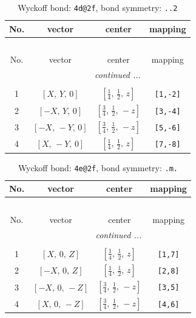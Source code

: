 \documentclass[fleqn,8pt]{jsarticle}
\begin{document}
\begin{longtable}{cccc}
\caption{Wyckoff bond: {\tt 4d@2f}, bond symmetry: {\tt ..2}}
 \\
 \hline \hline
No. & vector & center & mapping \\ \hline \endfirsthead

\multicolumn{3}{l}{\tablename\ \thetable{}} \\
 \hline \hline
No. & vector & center & mapping \\ \hline \endhead

 \hline \hline
\multicolumn{3}{r}{\footnotesize\it continued ...} \\ \endfoot

 \hline \hline
\multicolumn{3}{r}{} \\ \endlastfoot

1 & $\left[ X,\, Y,\, 0 \right]$ & $\left[ \frac{1}{4},\, \frac{1}{2},\, z \right]$ & {\tt [1,-2]} \\ \hline
2 & $\left[ - X,\, Y,\, 0 \right]$ & $\left[ \frac{3}{4},\, \frac{1}{2},\, - z \right]$ & {\tt [3,-4]} \\ \hline
3 & $\left[ - X,\, - Y,\, 0 \right]$ & $\left[ \frac{3}{4},\, \frac{1}{2},\, - z \right]$ & {\tt [5,-6]} \\ \hline
4 & $\left[ X,\, - Y,\, 0 \right]$ & $\left[ \frac{1}{4},\, \frac{1}{2},\, z \right]$ & {\tt [7,-8]} \\
\end{longtable}
\renewcommand{\arraystretch}{1.2}
\begin{longtable}{cccc}
\caption{Wyckoff bond: {\tt 4e@2f}, bond symmetry: {\tt .m.}}
 \\
 \hline \hline
No. & vector & center & mapping \\ \hline \endfirsthead

\multicolumn{3}{l}{\tablename\ \thetable{}} \\
 \hline \hline
No. & vector & center & mapping \\ \hline \endhead

 \hline \hline
\multicolumn{3}{r}{\footnotesize\it continued ...} \\ \endfoot

 \hline \hline
\multicolumn{3}{r}{} \\ \endlastfoot

1 & $\left[ X,\, 0,\, Z \right]$ & $\left[ \frac{1}{4},\, \frac{1}{2},\, z \right]$ & {\tt [1,7]} \\ \hline
2 & $\left[ - X,\, 0,\, Z \right]$ & $\left[ \frac{1}{4},\, \frac{1}{2},\, z \right]$ & {\tt [2,8]} \\ \hline
3 & $\left[ - X,\, 0,\, - Z \right]$ & $\left[ \frac{3}{4},\, \frac{1}{2},\, - z \right]$ & {\tt [3,5]} \\ \hline
4 & $\left[ X,\, 0,\, - Z \right]$ & $\left[ \frac{3}{4},\, \frac{1}{2},\, - z \right]$ & {\tt [4,6]} \\
\end{longtable}
\end{document}
